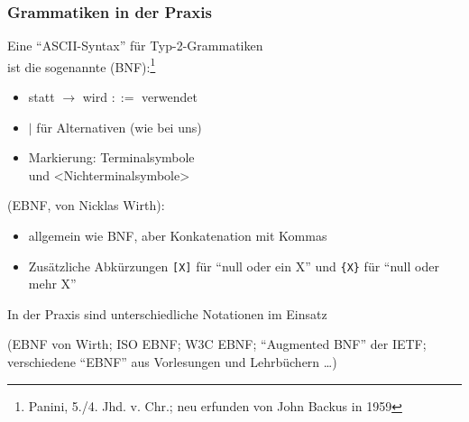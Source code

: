 \documentclass[aspectratio=1610,onlymath]{beamer}
\begin{document}
\begin{frame}\frametitle{Grammatiken in der Praxis}

Eine "`ASCII-Syntax"' für Typ-2-Grammatiken\\ ist die sogenannte  (BNF):\footnote{Panini, 5./4. Jhd. v. Chr.; neu erfunden von John Backus in 1959}

\begin{itemize}
\item statt $\to$ wird \alert{$\mathtt{::=}$} verwendet 
\item \alert{$\mid$} für Alternativen (wie bei uns)
\item Markierung: \alert{\squote}Terminalsymbole\alert{\squote}\\
      und {\alert{$\texttt{<}$}Nichterminalsymbole\alert{$\texttt{>}$}}
\end{itemize}

%
\pause{} (EBNF, von Nicklas Wirth):
\begin{itemize}
\item allgemein wie BNF, aber Konkatenation mit Kommas
\item Zusätzliche Abkürzungen \alert{\texttt{[X]}} für "`null oder ein X"' und \alert{\texttt{\{X\}}} für "`null oder mehr X"'
\end{itemize}

\alert{In der Praxis sind unterschiedliche Notationen im Einsatz}

{\footnotesize (EBNF von Wirth; ISO EBNF; W3C EBNF; "`Augmented BNF"' der IETF; verschiedene "`EBNF"' aus Vorlesungen und Lehrbüchern \ldots)}

\end{frame}
\end{document}
